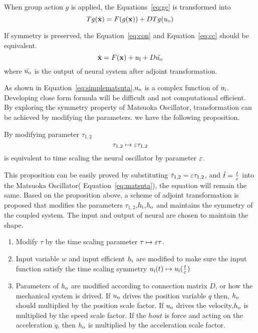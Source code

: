 When group action $g$ is applied, the Equations~\ref{eq:gc} is transformed into
\begin{equation}
\label{eq:cc}
Tg(\dot{\mathbf{x}})=F(g(\mathbf{x}))+DTg(u_{\mathrm{o}})
\end{equation}




If symmetry is preserved, the Equation~\ref{eq:con} and Equation~\ref{eq:cc} should be equivalent.
\begin{equation}
\label{eq:con}
\dot{\mathbf{x}}=F(\mathbf{x})+u_{\mathrm{l}}+D\tilde{u_{\mathrm{o}}}
\end{equation}
where $\tilde{u_{\mathrm{o}}}$ is the output of neural system after adjoint transformation.

As shown in Equation~\ref{eq:simplematsuta},$u_{\mathrm{o}}$ is a complex function of $u_{\mathrm{i}}$.
Developing close form formula will be difficult and not computational efficient.
By exploring the symmetry property of Matsuoka Oscillator, transformation can be achieved by modifying the parameters.
we have the following proposition.


\begin{myprop}
By modifying parameter $\tau_{1,2}$
\[
\tau_{1,2} \mapsto \varepsilon \tau_{1,2}
\]
is equivalent to time scaling the neural oscillator by parameter $\varepsilon$.
\end{myprop}

This proposition can be easily proved by  substituting $\tilde{\tau}_{1,2}=\varepsilon \tau_{1,2}$, and $\tilde{t}=\frac{t}{\varepsilon}$ into the Matsuoka Oscillator( Equation~\ref{eq:matsuta}), the equation will remain the same.
Based on the proposition above, a scheme of adjoint transformation is proposed that modifies the parameters $\tau_{1,2}$,$h_{\mathrm{i}}$,$h_{\mathrm{o}}$ and maintains the symmetry of the  coupled system.
The input and output of neural are chosen to maintain the shape.
\begin{enumerate}
\item Modify $\tau$ by the time scaling parameter $\tau \mapsto \varepsilon \tau$.
\item Input variable $w$ and input efficient $h_{\mathrm{i}}$ are modified to make sure the input function satisfy the time scaling symmetry $u_{\mathrm{i}}(t) \mapsto u_{\mathrm{i}}(\frac{t}{\varepsilon})$
\item  Parameters of $h_{\mathrm{o}}$ are modified according to connection matrix $D$, or how the mechanical system is drived.
If $u_{\mathrm{o}}$ drives the position variable $q$ then, $h_{\mathrm{o}}$ should multiplied by the position scale factor. 
If $u_{\mathrm{o}}$ drives the velocity,$h_{\mathrm{o}}$ is multiplied by the speed scale factor.
If the $hout$ is force and acting on the acceleration $\ddot{q}$, then $h_{\mathrm{o}}$ is multiplied by the acceleration scale factor.
\end{enumerate}


